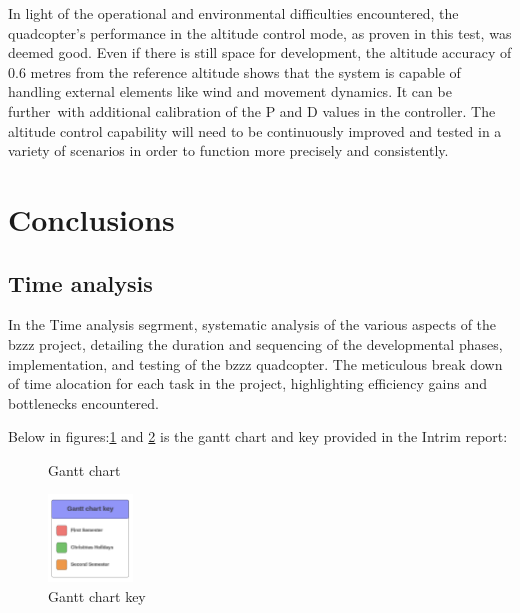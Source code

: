 \documentclass{article}
\begin{document}
In light of the operational and environmental difficulties encountered, the
quadcopter's performance in the altitude control mode, as proven in this test,
was deemed good. Even if there is still space for development, the altitude
accuracy of 0.6 metres from the reference altitude shows that the system is
capable of handling external elements like wind and movement dynamics. It can be
further with additional calibration of the P and D values in the controller. The
altitude control capability will need to be continuously improved and tested in
a variety of scenarios in order to function more precisely and consistently.


\section{Conclusions}
\subsection{Time analysis}
In the Time analysis segrment, systematic analysis of the various aspects of the
bzzz project, detailing the duration and sequencing of the developmental phases,
implementation, and testing of the bzzz quadcopter. The meticulous break down of
time alocation for each task in the project, highlighting efficiency gains and
bottlenecks encountered.

Below in figures:\ref{fig:gantt_chart} and \ref{fig:gantt_chart_key} is the
gantt chart and key provided in the Intrim report:
\begin{figure}[H]
  \centering
  \caption{Gantt chart}
  \label{fig:gantt_chart}
\end{figure}
\begin{figure}[H]
  \centering
  \includegraphics[width=0.2\textwidth]{Pictures/Gantt_chart_key.png}
  \caption{Gantt chart key}
  \label{fig:gantt_chart_key}
\end{figure}
\end{document}
